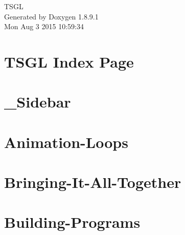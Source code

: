 \documentclass[twoside]{book}
\newcommand{\+}{\discretionary{\mbox{\scriptsize$\hookleftarrow$}}{}{}}
\newcommand{\clearemptydoublepage}{%
  \newpage{\pagestyle{empty}\cleardoublepage}%
}
\begin{document}
\hypersetup{pageanchor=false,
             bookmarks=true,
             bookmarksnumbered=true,
             pdfencoding=unicode
            }
\begin{titlepage}
\vspace*{7cm}
\begin{center}%
{\Large T\+S\+G\+L }\\
\vspace*{1cm}
{\large Generated by Doxygen 1.8.9.1}\\
\vspace*{0.5cm}
{\small Mon Aug 3 2015 10:59:34}\\
\end{center}
\end{titlepage}
\clearemptydoublepage
\tableofcontents
\clearemptydoublepage
{}
\hypersetup{pageanchor=true}

\chapter{T\+S\+G\+L Index Page}
\label{index}\hypertarget{index}{}
\chapter{\+\_\+\+Sidebar}
\label{md__home_pretzel_workspace_tsgl__t_s_g_l_docs-wiki___sidebar}
\hypertarget{md__home_pretzel_workspace_tsgl__t_s_g_l_docs-wiki___sidebar}{}

\chapter{Animation-\/\+Loops}
\label{md__home_pretzel_workspace_tsgl__t_s_g_l_docs-wiki__animation-_loops}
\hypertarget{md__home_pretzel_workspace_tsgl__t_s_g_l_docs-wiki__animation-_loops}{}

\chapter{Bringing-\/\+It-\/\+All-\/\+Together}
\label{md__home_pretzel_workspace_tsgl__t_s_g_l_docs-wiki__bringing-_it-_all-_together}
\hypertarget{md__home_pretzel_workspace_tsgl__t_s_g_l_docs-wiki__bringing-_it-_all-_together}{}

\chapter{Building-\/\+Programs}
\label{md__home_pretzel_workspace_tsgl__t_s_g_l_docs-wiki__building-_programs}
\hypertarget{md__home_pretzel_workspace_tsgl__t_s_g_l_docs-wiki__building-_programs}{}

\end{document}
